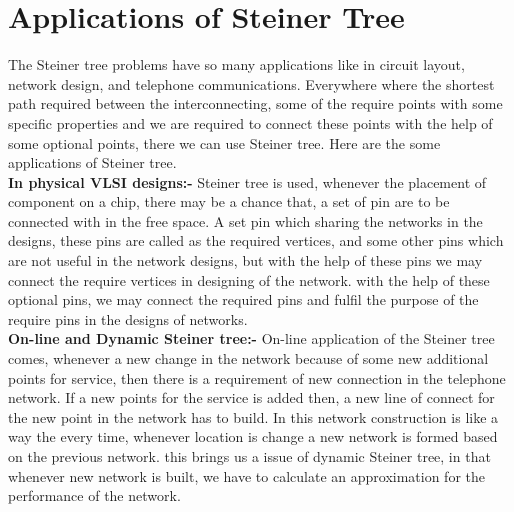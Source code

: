 \section{Applications of Steiner Tree}
 The Steiner tree problems have so many applications like in circuit layout, network design, and telephone communications. Everywhere where the shortest path required between the interconnecting, some of the require points with some specific properties and we are required to connect these points with the help of some optional points, there we can use Steiner tree.
  Here are the some applications of Steiner tree.\\
 \textbf{In physical VLSI designs:-}
  Steiner tree is used, whenever the placement of component on a chip, there may be a chance that, a set of pin are to be connected with in the free space. A set pin which sharing the networks in the designs, these pins are called as the required vertices, and some other pins which are not useful in the network designs, but with the help of these pins we may connect the require vertices in designing of the network. with the help of these optional pins, we may connect the required pins and fulfil the purpose of the require pins in the designs of networks.\\
 \textbf{On-line and Dynamic Steiner tree:-}
 On-line application of the Steiner tree comes, whenever a new change in the network because of some new additional points for service, then there is a requirement of new connection in the telephone network. If a new points for the service is added then, a new line of connect for the new point in the network has to build. In this network construction is like a way the every time, whenever location is change a new network is formed based on the previous network. this brings us a issue of dynamic Steiner tree, in that whenever new network is built, we have to calculate an approximation for the performance of the network.
